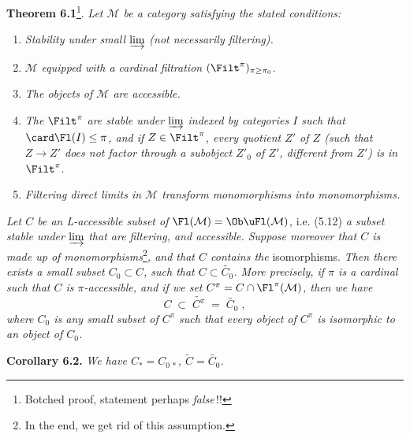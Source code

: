 \setcounter{footnote}{25}
\textbf{Theorem 6.1}\footnote{Botched proof, statement perhaps \textit{false}\,!!}. \textit{Let $\mathcal{M}$ be a category satisfying the stated conditions:}
\begin{enumerate}[label={}]
\item[a)] \textit{Stability under small} $\varinjlim$ \textit{(not necessarily filtering).}
\item[b)] $\mathcal{M}$ \textit{equipped with a cardinal filtration} $(\Filt^{\pi})_{\pi\geq\pi_{0}}$.
\item[c)] \textit{The objects of $\mathcal{M}$ are accessible.}
\item[d)] \textit{The} $\Filt^{\pi}$ \textit{are stable under} $\varinjlim$ \textit{indexed by categories $I$ such that} $\card \Fl(I) \leq \pi$\textit{, and if $Z \in \Filt^{\pi}$, every quotient $Z'$ of $Z$ (such that $Z \longrightarrow Z'$ does not factor through a subobject $Z'_{0}$ of $Z'$, different from $Z'$) is in} $\Filt^{\pi}$.
\item[e)] \textit{Filtering direct limits in $\mathcal{M}$ transform monomorphisms into monomorphisms.}
\end{enumerate}
\textit{Let $C$ be an L-accessible subset of} $\Fl(\mathcal{M}) = \Ob\uFl(\mathcal{M})$, i.e. (5.12) \textit{a subset stable under} $\varinjlim$ \textit{that are filtering, and accessible. Suppose moreover that $C$ is made up of monomorphisms}\footnote{In the end, we get rid of this assumption.}\textit{, and that $C$ contains the} isomorphisms. \textit{Then there exists a small subset $C_{0} \subset C$, such that $C \subset \widetilde{C_{0}}$. More precisely, if $\pi$ is a cardinal such that $C$ is $\pi$-accessible, and if we set $C^{\pi} = C \cap \Fl^{\pi}(\mathcal{M})$, then we have}
\[
C \;\subset\; \widetilde{C^{\pi}} \;=\; \widetilde{C_{0}} \; ,
\tag*{(6.1.1)}
\]
\textit{where $C_{0}$ is any small subset of $C^{\pi}$ such that every object of $C^{\pi}$ is isomorphic to an object of $C_{0}$.}

\textbf{Corollary 6.2.} \textit{We have $C_{*} = C_{0\,*}$, $\widetilde{C} = \widetilde{C_{0}}$.}

